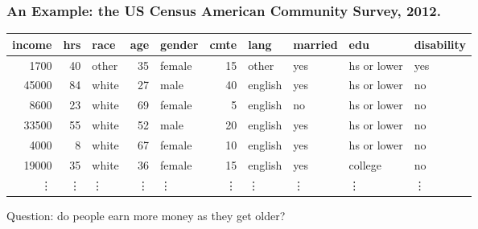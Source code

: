 \documentclass[aspectratio=169]{beamer}
\theoremstyle{principle}
\begin{document}
\begin{frame}
\frametitle{An Example: the US Census American Community Survey, 2012.}
\small
\begin{table}[ht]
\centering
\begin{tabular}{rrlrlrllll}
  \hline
 income  & hrs & race & age & gender & cmte & lang & married & edu & disability \\ 
  \hline
 1700  &  40 & other &  35 & female  &  15 & other & yes & hs or lower & yes \\ 
 45000  &  84 & white &  27 & male  &  40 & english & yes & hs or lower & no \\ 
 8600  &  23 & white &  69 & female  &   5 & english & no & hs or lower & no \\ 
 33500  &  55 & white &  52 & male  &  20 & english & yes & hs or lower & no \\ 
 4000  &   8 & white &  67 & female  &  10 & english & yes & hs or lower & no \\ 
 19000  &  35 & white &  36 & female  &  15 & english & yes & college & no \\ 
\vdots &\vdots &\vdots &\vdots &\vdots &\vdots &\vdots &\vdots &\vdots &\vdots \\
   \hline
\end{tabular}
\end{table}
\bigskip\Large
\begin{center}
Question: do people earn more money as they get older?
\end{center}

\end{frame}
\end{document}
